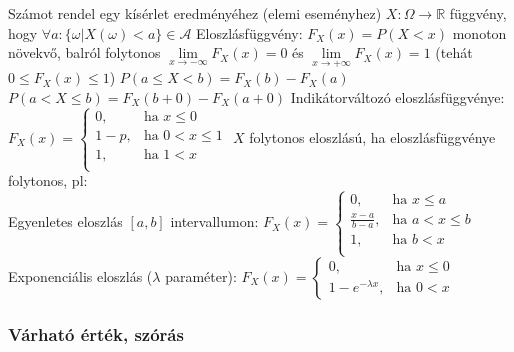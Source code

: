 \documentclass[12pt,a4paper]{article}
\begin{document}
\begin{outline}
	\1 Számot rendel egy kísérlet eredményéhez (elemi eseményhez)
	\1 $X:\Omega \to \mathbb{R}$ függvény, hogy $\forall a: \{\omega | X(\omega) < a\} \in \mathcal{A}$
	\1 Eloszlásfüggvény: $F_X(x) = P(X < x)$
		\2 monoton növekvő, balról folytonos
		\2 $\lim\limits_{x \to -\infty} F_X(x) = 0$ és $\lim\limits_{x \to +\infty} F_X(x)=1$ \;\; (tehát $0 \le F_X(x) \le 1$)
	\1 $P(a \le X < b) = F_X(b) - F_X(a)$\\
	$P(a < X \le b) = F_X(b+0) - F_X(a+0)$%
	\1 Indikátorváltozó eloszlásfüggvénye: $F_X(x) = \begin{cases}
		0, &\text{ha } x \le 0\\
		1-p, &\text{ha } 0 < x \le 1\\
		1, &\text{ha } 1 < x\\
	\end{cases}$
	\1 $X$ folytonos eloszlású, ha eloszlásfüggvénye folytonos, pl:\\
	Egyenletes eloszlás $[a,b]$ intervallumon: $F_X(x) = \begin{cases}
		0, &\text{ha } x \le a\\
		\frac{x-a}{b-a}, &\text{ha } a < x \le b\\
		1, &\text{ha } b < x\\
	\end{cases}$
	\1 Exponenciális eloszlás ($\lambda$ paraméter): $F_X(x) = \begin{cases}
		0, &\text{ha } x \le 0\\
		1-e^{-\lambda x}, &\text{ha } 0 < x
	\end{cases}$
\end{outline}

\pagebreak

\subsubsection{Várható érték, szórás}
\end{document}
